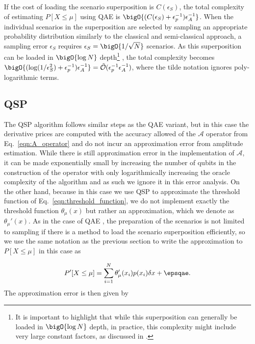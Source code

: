\begin{enumerate}
If the cost of loading the scenario superposition is $C(\epsilon_S)$, the total complexity of estimating $P[X \le \mu]$ using QAE \var{} is $\bigO{(C(\epsilon_S)+\epsilon_p^{-1})\epsilon_A^{-1}}$.
When the individual scenarios in the superposition are selected by sampling an appropriate probability distribution similarly to the classical and semi-classical approach, a sampling error $\epsilon_S$ requires $\epsilon_S=\bigO{1/\sqrt{N}}$ scenarios.
As this superposition can be loaded in $\bigO{\log N}$ depth\footnote{It is important to highlight that while this superposition can generally be loaded in $\bigO{\log N}$ depth, in practice, this complexity might include very large constant factors, as discussed in \cite{clader2022quantum}.} \cite{clader2022quantum}, the total complexity becomes $\bigO{(\log(1/\epsilon_S^2)+\epsilon_p^{-1})\epsilon_A^{-1}} = \tilde{\mathcal{O}}(\epsilon_p^{-1}\epsilon_A^{-1})$, where the tilde notation ignores poly-logarithmic terms.


\subsection{QSP \var{}}
\label{sec:qsp_error}
The QSP \var{} algorithm follows similar steps as the QAE variant, but in this case the derivative prices are computed with the accuracy allowed of the $\mathcal{A}$ operator from Eq.~\eqref{eqn:A_operator} and do not incur an approximation error from amplitude estimation.
While there is still approximation error in the implementation of $\mathcal{A}$, it can be made exponentially small by increasing the number of qubits in the construction of the operator with only logarithmically increasing the oracle complexity of the algorithm \cite{chakrabarti2021threshold} and as such we ignore it in this error analysis.
On the other hand, because in this case we use QSP to approximate the threshold function of Eq.~\eqref{eqn:threshold_function}, we do not implement exactly the threshold function $\theta_{\mu}(x)$ but rather an approximation, which we denote as $\theta_{\mu}'(x)$.
As in the case of QAE \var{}, the preparation of the scenarios is not limited to sampling if there is a method to load the scenario superposition efficiently, so we use the same notation as the previous section to write the approximation to $P[X \le \mu]$ in this case as

\begin{equation}
	P'[X \le \mu] = \sum_{i=1}^N \theta_{\mu}'(x_i)p(x_i)\delta x + \epsqae.
\end{equation}
The approximation error is then given by


\end{enumerate}
